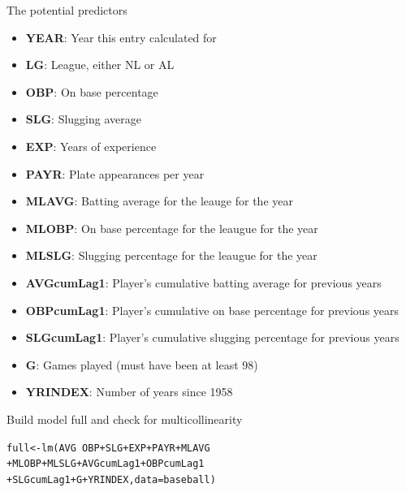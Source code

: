 \documentclass{beamer}\usepackage[]{graphicx}\usepackage[]{color}
\makeatletter
\newcommand{\hlopt}[1]{\textcolor[rgb]{1,0.894,0.769}{#1}}%
\newcommand{\hlstd}[1]{\textcolor[rgb]{1,0.894,0.769}{#1}}%
\newcommand{\hlkwb}[1]{\textcolor[rgb]{0.804,0.776,0.451}{#1}}%
\newcommand{\hlkwc}[1]{\textcolor[rgb]{0.78,0.941,0.545}{#1}}%
\newcommand{\hlkwd}[1]{\textcolor[rgb]{1,0.78,0.769}{#1}}%
\newenvironment{kframe}{%
 \def\at@end@of@kframe{}%
 \ifinner\ifhmode%
  \def\at@end@of@kframe{\end{minipage}}%
  \begin{minipage}{\columnwidth}%
 \fi\fi%
 \def\FrameCommand##1{\hskip\@totalleftmargin \hskip-\fboxsep
 \colorbox{shadecolor}{##1}\hskip-\fboxsep
     \hskip-\linewidth \hskip-\@totalleftmargin \hskip\columnwidth}%
 \MakeFramed {\advance\hsize-\width
   \@totalleftmargin\z@ \linewidth\hsize
   \@setminipage}}%
 {\par\unskip\endMakeFramed%
 \at@end@of@kframe}
\newenvironment{knitrout}{}{} %
\makeatother
\begin{document}
\begin{darkframes}
    \begin{frame}[fragile]{The potential predictors}
      \fontsize{10}{10}\selectfont
      \begin{itemize}
        \item \textbf{YEAR}:         Year this entry calculated for 
        \item \textbf{LG}:           League, either NL or AL
        \item \textbf{OBP}:          On base percentage
        \item \textbf{SLG}:          Slugging average
        \item \textbf{EXP}:          Years of experience
        \item \textbf{PAYR}:         Plate appearances per year
        \item \textbf{MLAVG}:        Batting average for the leauge for the year
        \item \textbf{MLOBP}:        On base percentage for the leaugue for the year
        \item \textbf{MLSLG}:        Slugging percentage for the leaugue for the year
        \item \textbf{AVGcumLag1}:   Player's cumulative batting average for previous years
        \item \textbf{OBPcumLag1}:   Player's cumulative on base percentage for previous years
        \item \textbf{SLGcumLag1}:   Player's cumulative slugging percentage for previous years
        \item \textbf{G}:            Games played (must have been at least 98)
        \item \textbf{YRINDEX}:      Number of years since 1958
      \end{itemize}

      \lc %
    \end{frame}


    \begin{frame}[fragile]{Build model full and check for multicollinearity}
      \fontsize{9}{9}\selectfont

\begin{knitrout}
\begin{kframe}
\begin{alltt}
\hlstd{full} \hlkwb{<-} \hlkwd{lm}\hlstd{(AVG} \hlopt{~} \hlstd{OBP} \hlopt{+} \hlstd{SLG} \hlopt{+} \hlstd{EXP} \hlopt{+} \hlstd{PAYR} \hlopt{+} \hlstd{MLAVG}
                  \hlopt{+} \hlstd{MLOBP} \hlopt{+} \hlstd{MLSLG} \hlopt{+} \hlstd{AVGcumLag1} \hlopt{+} \hlstd{OBPcumLag1}
                  \hlopt{+} \hlstd{SLGcumLag1} \hlopt{+} \hlstd{G} \hlopt{+} \hlstd{YRINDEX,} \hlkwc{data}\hlstd{=baseball)}


\end{alltt}
\end{kframe}
\end{knitrout}
\end{frame}
\end{darkframes}
\end{document}
